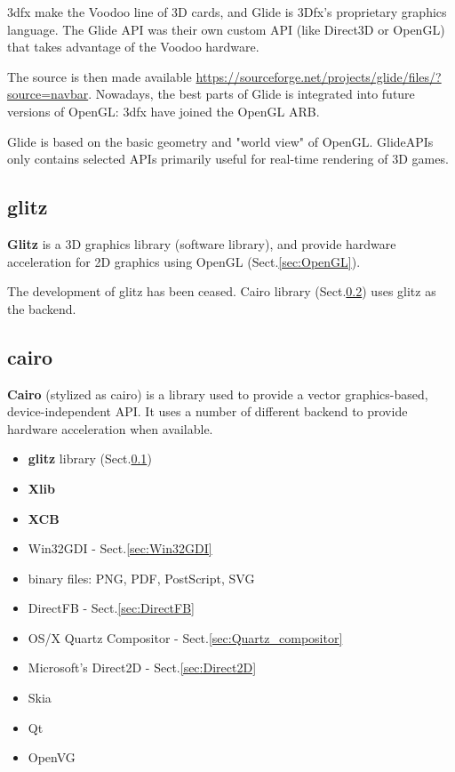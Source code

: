 3dfx make the Voodoo line of 3D cards, and Glide is 3Dfx's proprietary graphics
language. The Glide API was their own custom API (like Direct3D or OpenGL) that
takes advantage of the Voodoo hardware.

The source is then made available
\url{https://sourceforge.net/projects/glide/files/?source=navbar}. Nowadays, the
best parts of Glide is integrated into future versions of OpenGL:
3dfx have joined the OpenGL ARB.

Glide is based on the basic geometry and "world view" of OpenGL. GlideAPIs only
contains selected APIs primarily useful for real-time rendering of 3D games.





\subsection{glitz}
\label{sec:glitz}

{\bf Glitz} is a 3D graphics library (software library), and
provide hardware acceleration for 2D graphics using OpenGL
(Sect.\ref{sec:OpenGL}).

The development of glitz has been ceased. Cairo library (Sect.\ref{sec:cairo})
uses glitz as the backend.

\subsection{cairo}
\label{sec:cairo}

{\bf Cairo} (stylized as cairo) is a library used to provide a vector
graphics-based, device-independent API. It uses a number of different backend to provide 
hardware acceleration when available.
\begin{itemize}
  \item {\bf glitz} library (Sect.\ref{sec:glitz})
  \item {\bf Xlib}
  \item {\bf XCB}
  \item Win32GDI - Sect.\ref{sec:Win32GDI}
  \item binary files: PNG, PDF, PostScript, SVG
  \item DirectFB - Sect.\ref{sec:DirectFB}
  \item OS/X Quartz Compositor - Sect.\ref{sec:Quartz_compositor}
  \item Microsoft's Direct2D - Sect.\ref{sec:Direct2D}
  \item Skia
  \item Qt
  \item OpenVG

\end{itemize}

